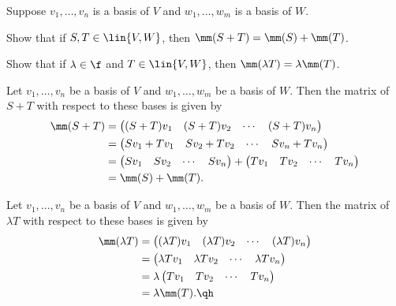 \begin{exercise}[3c3]
    Suppose $v_1, \ldots, v_n$ is a basis of $V$ and $w_1, \ldots, w_m$ is a basis of $W$.
    \begin{subexercises}
        \item Show that if $S, T \in \lin{V, W}$, then $\mm(S + T) = \mm(S) + \mm(T)$.
        \item Show that if $\lambda \in \f$ and $T \in \lin{V, W}$, then $\mm(\lambda T) = \lambda \mm(T)$.
    \end{subexercises}
\end{exercise}

\begin{sole}
    \item Let $v_1, \ldots, v_n$ be a basis of $V$ and $w_1, \ldots, w_m$ be a basis of $W$. Then the matrix of $S + T$ with respect to these bases is given by
    \begin{align*}
        \mm(S + T) & = 
        \begin{pmatrix}
            (S + T)v_1 & (S + T)v_2 & \cdots & (S + T)v_n
        \end{pmatrix} \\
        & = 
        \begin{pmatrix}
            Sv_1 + Tv_1 & Sv_2 + Tv_2 & \cdots & Sv_n + Tv_n
        \end{pmatrix} \\
        & = 
        \begin{pmatrix}
            Sv_1 & Sv_2 & \cdots & Sv_n
        \end{pmatrix} +
        \begin{pmatrix}
            Tv_1 & Tv_2 & \cdots & Tv_n
        \end{pmatrix} \\
        & = \mm(S) + \mm(T).
    \end{align*}
    \item Let $v_1, \ldots, v_n$ be a basis of $V$ and $w_1, \ldots, w_m$ be a basis of $W$. Then the matrix of $\lambda T$ with respect to these bases is given by
    \begin{align*}
        \mm(\lambda T) & = 
        \begin{pmatrix}
            (\lambda T)v_1 & (\lambda T)v_2 & \cdots & (\lambda T)v_n
        \end{pmatrix} \\
        & = 
        \begin{pmatrix}
            \lambda Tv_1 & \lambda Tv_2 & \cdots & \lambda Tv_n
        \end{pmatrix} \\
        & = \lambda
        \begin{pmatrix}
            Tv_1 & Tv_2 & \cdots & Tv_n
        \end{pmatrix} \\
        & = \lambda \mm(T). \qh
    \end{align*}
\end{sole}

